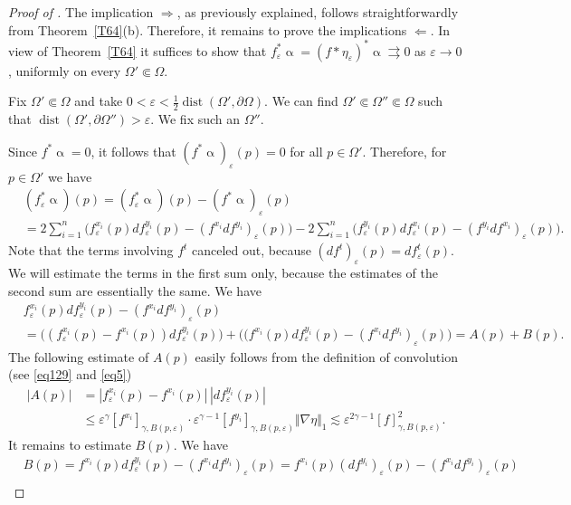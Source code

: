 \documentclass[intlimits,12pt,reqno]{amsart}
\newcommand{\eps}{\varepsilon}
\numberwithin{equation}{section}
\def\dist{\operatorname{dist}}
\theoremstyle{definition}
\begin{document}
\begin{proof}[Proof of ]
The implication $\Rightarrow$, as previously explained, follows straightforwardly from Theorem~\ref{T64}(b). Therefore, it remains to prove the implications $\Leftarrow$.
In view of Theorem~\ref{T64} it suffices to show that
$f^*_\eps\upalpha=(f*\eta_\eps)^*\upalpha\rightrightarrows 0$ as $\eps\to 0$, uniformly on every
$\Omega'\Subset\Omega$.

Fix $\Omega'\Subset\Omega$ and take $0<\eps<\frac{1}{2}\dist(\Omega',\partial\Omega)$. We can
find $\Omega'\Subset\Omega''\Subset\Omega$ such that $\dist(\Omega',\partial\Omega'')>\eps$.
We fix such an $\Omega''$.

Since $f^*\upalpha=0$, it follows that $(f^*\upalpha)_\eps(p)=0$ for all $p\in\Omega'$. Therefore, for $p\in\Omega'$ we have
\begin{equation}
\label{eq132}
\begin{split}
&
(f_\eps^*\upalpha)(p)
= 
(f_\eps^*\upalpha)(p)- (f^*\upalpha)_\eps(p)\\
&=
2\sum_{i=1}^n
\big(f_\eps^{x_i}(p)df_{\eps}^{y_i}(p)-(f^{x_i}df^{y_i})_\eps(p)\big)
-
2\sum_{i=1}^n
\big(f_\eps^{y_i}(p)df_{\eps}^{x_i}(p)-(f^{y_i}df^{x_i})_\eps(p)\big).
\end{split}
\end{equation}
Note that the terms involving $f^t$ canceled out, because $(df^t)_\eps(p)=df_\eps^t(p)$. 
We will estimate the terms in the first sum only, because the estimates of the second sum are essentially the same. We have
\[
\begin{split}
&
f_\eps^{x_i}(p)df_{\eps}^{y_i}(p)-(f^{x_i}df^{y_i})_\eps(p)\\
&=
\big((f_\eps^{x_i}(p)-f^{x_i}(p))df_{\eps}^{y_i}(p)\big)+
\big((f^{x_i}(p)df_{\eps}^{y_i}(p)-(f^{x_i}df^{y_i})_\eps(p)\big)=A(p)+B(p).
\end{split}
\]
The following estimate of $A(p)$ easily follows from the definition of convolution (see \eqref{eq129} and \eqref{eq5})
\[
\begin{split}
|A(p)|
&=
|f_\eps^{x_i}(p)-f^{x_i}(p)|\, |df_{\eps}^{y_i}(p)|\\
&\leq
\eps^\gamma [f^{x_i}]_{\gamma,B(p,\eps)}
\cdot
\eps^{\gamma-1}[f^{y_i}]_{\gamma,B(p,\eps)}\Vert\nabla\eta\Vert_1
\lesssim
\eps^{2\gamma-1}[f]^2_{\gamma,B(p,\eps)}.
\end{split}
\]
It remains to estimate $B(p)$. We have
\[
\begin{split}
&
B(p)=
f^{x_i}(p)df_{\eps}^{y_i}(p)-(f^{x_i}df^{y_i})_\eps(p)
=
f^{x_i}(p)(df^{y_i})_\eps(p)-(f^{x_i}df^{y_i})_\eps(p)\\

\end{split}\]
\end{proof}
\end{document}
